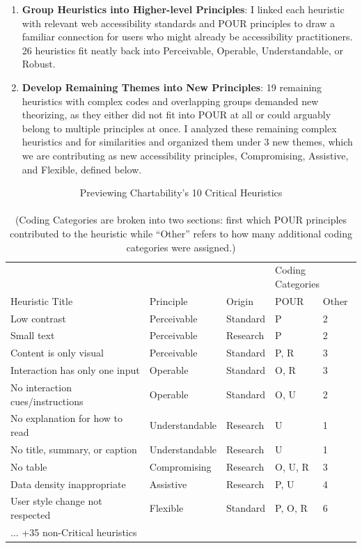 \documentclass{egpubl}
\begin{document}
\begin{enumerate}
    \item \textbf{Group Heuristics into Higher-level Principles}: I linked each heuristic with relevant web accessibility standards and POUR principles to draw a familiar connection for users who might already be accessibility practitioners. 26 heuristics fit neatly back into Perceivable, Operable, Understandable, or Robust.
    \item \textbf{Develop Remaining Themes into New Principles}: 19 remaining heuristics with complex codes and overlapping groups demanded new theorizing, as they either did not fit into POUR at all or could arguably belong to multiple principles at once. I analyzed these remaining complex heuristics and for similarities and organized them under 3 new themes, which we are contributing as new accessibility principles, Compromising, Assistive, and Flexible, defined below.
\end{enumerate}

\begin{table}[tb]
  \caption{Previewing Chartability's 10 Critical Heuristics\\\hspace{\textwidth}\\\hspace{\textwidth}(Coding Categories are broken into two sections: first which POUR principles contributed to the heuristic while ``Other'' refers to how many additional coding categories were assigned.)}
  \label{tab:table}
  \scriptsize
\begin{tabular}{lll|ll}
                &             &          & \multicolumn{2}{l}{Coding Categories} \\
  Heuristic Title & Principle   & Origin   & POUR              & Other           \\
  \midrule
  Low contrast                             & Perceivable & Standard & P & 2 \\
  Small text                               & Perceivable & Research & P & 2 \\
  Content is only visual                   & Perceivable & Standard & P, R & 3 \\
  Interaction has only one input           & Operable & Standard & O, R & 3 \\
  No interaction cues/instructions         & Operable & Standard & O, U & 2 \\
  No explanation for how to read           & Understandable & Research & U & 1 \\
  No title, summary, or caption            & Understandable & Research & U & 1 \\
  No table                                 & Compromising & Research & O, U, R & 3 \\
  Data density inappropriate               & Assistive & Research & P, U & 4 \\
  User style change not respected          & Flexible & Standard & P, O, R & 6 \\
  ... +35 non-Critical heuristics          &  &  &  &  \\
\end{tabular}
\end{table}
\end{document}

